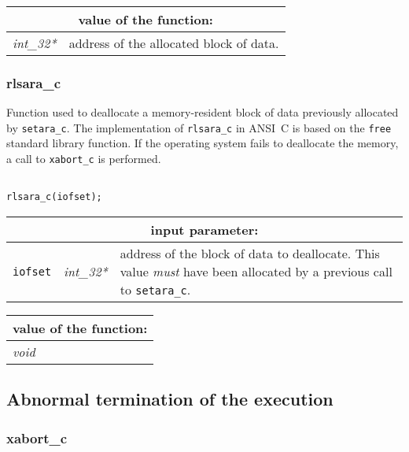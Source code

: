 \vskip 0.8cm

\noindent
\begin{tabular}{|p{4.0cm}|p{11cm}|}
\hline
\multicolumn{2}{|c|}{\bf value of the function:} \\
\hline
{\it int\_32*} & address of the allocated block of data. \\
\hline
\end{tabular}

\subsubsection{rlsara\_c}\label{sect:rlsara}

Function used to deallocate a memory-resident block of data previously allocated by {\tt setara\_c}.
The implementation of {\tt rlsara\_c} in ANSI~C is based on the {\tt free} standard library function. If the operating system fails to deallocate
the memory, a call to {\tt xabort\_c} is performed.

\begin{verbatim}

rlsara_c(iofset);
\end{verbatim}

\noindent
\begin{tabular}{|p{1.5cm}|p{2cm}|p{11cm}|}
\hline
\multicolumn{3}{|c|}{\bf input parameter:} \\
\hline
{\tt iofset} & {\it int\_32*} & address of the block of data to deallocate. This value {\sl must} have been allocated by a previous call to {\tt setara\_c}. \\
\hline
\end{tabular}
\vskip 0.8cm

\noindent
\begin{tabular}{|p{4.0cm}|p{11cm}|}
\hline
\multicolumn{2}{|c|}{\bf value of the function:} \\
\hline
{\it void} &  \\
\hline
\end{tabular}

\subsection{Abnormal termination of the execution}

\subsubsection{xabort\_c}

